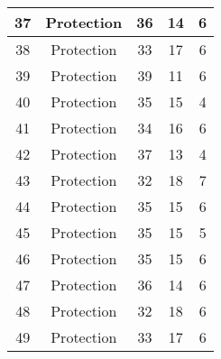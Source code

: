 \documentclass[results.tex]{subfiles}
\begin{document}
\begin{center}
\begin{tabular}{| c || c | c | c | c |}
            \hline
            37                      & Protection                   & 36                     & 14                      & 6                    \\
            \hline
            38                      & Protection                   & 33                     & 17                      & 6                    \\
            \hline
            39                      & Protection                   & 39                     & 11                      & 6                    \\
            \hline
            40                      & Protection                   & 35                     & 15                      & 4                    \\
            \hline
            41                      & Protection                   & 34                     & 16                      & 6                    \\
            \hline
            42                      & Protection                   & 37                     & 13                      & 4                    \\
            \hline
            43                      & Protection                   & 32                     & 18                      & 7                    \\
            \hline
            44                      & Protection                   & 35                     & 15                      & 6                    \\
            \hline
            45                      & Protection                   & 35                     & 15                      & 5                    \\
            \hline
            46                      & Protection                   & 35                     & 15                      & 6                    \\
            \hline
            47                      & Protection                   & 36                     & 14                      & 6                    \\
            \hline
            48                      & Protection                   & 32                     & 18                      & 6                    \\
            \hline
            49                      & Protection                   & 33                     & 17                      & 6                    \\
            \hline
        \end{tabular}
    \end{center}
\end{document}
